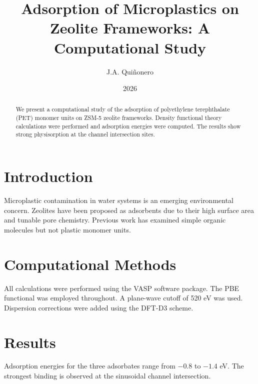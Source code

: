 \documentclass[12pt]{article}
\title{Adsorption of Microplastics on Zeolite Frameworks: A Computational Study}
\author{J.A. Quiñonero}
\date{2026}
\begin{document}
\maketitle

\begin{abstract}
We present a computational study of the adsorption of polyethylene terephthalate (PET)
monomer units on ZSM-5 zeolite frameworks. Density functional theory calculations were
performed and adsorption energies were computed. The results show strong physisorption
at the channel intersection sites.
\end{abstract}

\section{Introduction}

Microplastic contamination in water systems is an emerging environmental concern.
Zeolites have been proposed as adsorbents due to their high surface area and tunable
pore chemistry. Previous work has examined simple organic molecules but not plastic
monomer units.

\section{Computational Methods}

All calculations were performed using the VASP software package.
The PBE functional was employed throughout. A plane-wave cutoff of 520 eV was used.
Dispersion corrections were added using the DFT-D3 scheme.

\section{Results}

Adsorption energies for the three adsorbates range from $-0.8$ to $-1.4$ eV.
The strongest binding is observed at the sinusoidal channel intersection.
\end{document}
